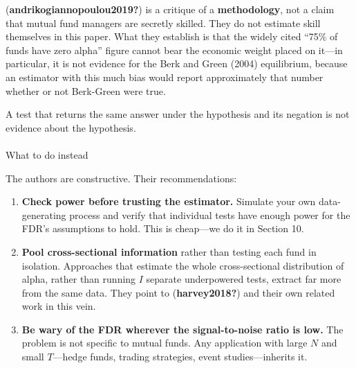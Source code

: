 \documentclass[
  letterpaper,
  DIV=11,
  numbers=noendperiod]{scrartcl}
\makeatletter
\let\oldparagraph\paragraph
\renewcommand{\paragraph}{
    \@ifstar
      \xxxParagraphStar
      \xxxParagraphNoStar
  }
\newcommand{\xxxParagraphStar}[1]{\oldparagraph*{#1}\mbox{}}
\newcommand{\xxxParagraphNoStar}[1]{\oldparagraph{#1}\mbox{}}
\providecommand{\tightlist}{%
  \setlength{\itemsep}{0pt}\setlength{\parskip}{0pt}}
\makeatother
\begin{document}
\begin{tcolorbox}[enhanced jigsaw, arc=.35mm, bottomrule=.15mm, bottomtitle=1mm, breakable, colback=white, colbacktitle=quarto-callout-note-color!10!white, colframe=quarto-callout-note-color-frame, coltitle=black, left=2mm, leftrule=.75mm, opacityback=0, opacitybacktitle=0.6, rightrule=.15mm, title=\textcolor{quarto-callout-note-color}{\faInfo}\hspace{0.5em}{What this does and does not overturn}, titlerule=0mm, toprule=.15mm, toptitle=1mm]

(\textbf{andrikogiannopoulou2019?}) is a critique of a
\textbf{methodology}, not a claim that mutual fund managers are secretly
skilled. They do not estimate skill themselves in this paper. What they
establish is that the widely cited ``75\% of funds have zero alpha''
figure cannot bear the economic weight placed on it---in particular, it
is not evidence for the Berk and Green (2004) equilibrium, because an
estimator with this much bias would report approximately that number
whether or not Berk-Green were true.

A test that returns the same answer under the hypothesis and its
negation is not evidence about the hypothesis.

\end{tcolorbox}

\paragraph{What to do instead}\label{what-to-do-instead}

The authors are constructive. Their recommendations:

\begin{enumerate}
\def\labelenumi{\arabic{enumi}.}
\tightlist
\item
  \textbf{Check power before trusting the estimator.} Simulate your own
  data-generating process and verify that individual tests have enough
  power for the FDR's assumptions to hold. This is cheap---we do it in
  Section 10.
\item
  \textbf{Pool cross-sectional information} rather than testing each
  fund in isolation. Approaches that estimate the whole cross-sectional
  distribution of alpha, rather than running \(I\) separate underpowered
  tests, extract far more from the same data. They point to
  (\textbf{harvey2018?}) and their own related work in this vein.
\item
  \textbf{Be wary of the FDR wherever the signal-to-noise ratio is low.}
  The problem is not specific to mutual funds. Any application with
  large \(N\) and small \(T\)---hedge funds, trading strategies, event
  studies---inherits it.
\end{enumerate}
\end{document}
